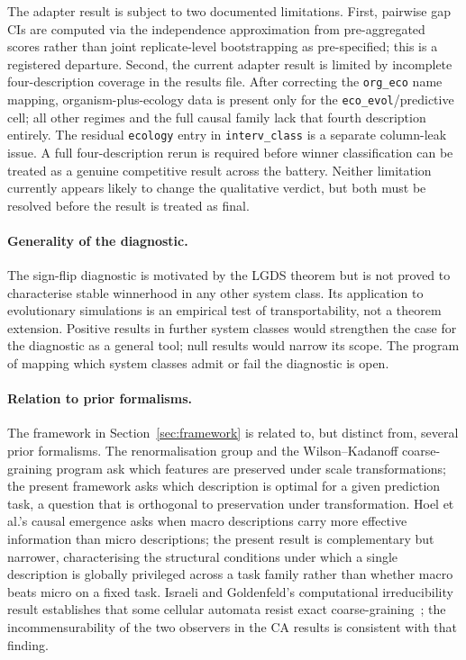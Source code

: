 \documentclass[11pt]{article}
\begin{document}
The adapter result is subject to two documented limitations.
First, pairwise gap CIs are computed via the independence approximation
from pre-aggregated scores rather than joint replicate-level bootstrapping
as pre-specified; this is a registered departure.
Second, the current adapter result is limited by incomplete four-description
coverage in the results file.
After correcting the \texttt{org\_eco} name mapping, organism-plus-ecology
data is present only for the \texttt{eco\_evol}/predictive cell;
all other regimes and the full causal family lack that fourth description
entirely.
The residual \texttt{ecology} entry in \texttt{interv\_class} is a
separate column-leak issue.
A full four-description rerun is required before winner classification can
be treated as a genuine competitive result across the battery.
Neither limitation currently appears likely to change the qualitative
verdict, but both must be resolved before the result is treated as final.

\paragraph{Generality of the diagnostic.}
The sign-flip diagnostic is motivated by the LGDS theorem but is not
proved to characterise stable winnerhood in any other system class.
Its application to evolutionary simulations is an empirical test of
transportability, not a theorem extension.
Positive results in further system classes would strengthen the case for
the diagnostic as a general tool; null results would narrow its scope.
The program of mapping which system classes admit or fail the diagnostic
is open.

\paragraph{Relation to prior formalisms.}
The framework in Section~\ref{sec:framework} is related to, but distinct
from, several prior formalisms.
The renormalisation group and the Wilson--Kadanoff coarse-graining program
ask which features are preserved under scale transformations;
the present framework asks which description is optimal for a given
prediction task, a question that is orthogonal to preservation under
transformation.
Hoel et al.'s causal emergence asks when macro descriptions carry more
effective information than micro descriptions;
the present result is complementary but narrower, characterising the
structural conditions under which a single description is globally privileged
across a task family rather than whether macro beats micro on a fixed task.
Israeli and Goldenfeld's computational irreducibility result establishes
that some cellular automata resist exact coarse-graining~\citep{israeli2004};
the incommensurability of the two observers in the CA results is consistent
with that finding.
\end{document}
